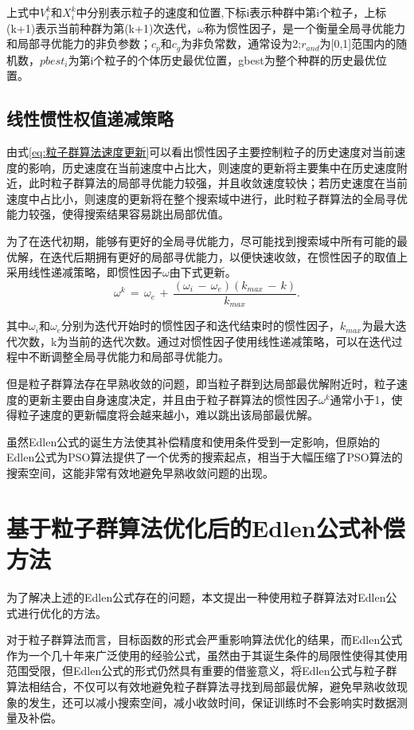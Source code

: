 上式中\(V^{k}_i\)和\( X^{k}_i\)中分别表示粒子的速度和位置,下标i表示种群中第i个粒子，上标(k+1)表示当前种群为第(k+1)次迭代，\(\omega\)称为惯性因子，是一个衡量全局寻优能力和局部寻优能力的非负参数；\(c_p\)和\(c_g\)为非负常数，通常设为2;\(r_{and}\)为[0,1]范围内的随机数，\(pbest_i\)为第i个粒子的个体历史最优位置，gbest为整个种群的历史最优位置。

\subsection{线性惯性权值递减策略}
由式\eqref{eq:粒子群算法速度更新}可以看出惯性因子主要控制粒子的历史速度对当前速度的影响，历史速度在当前速度中占比大，则速度的更新将主要集中在历史速度附近，此时粒子群算法的局部寻优能力较强，并且收敛速度较快；若历史速度在当前速度中占比小，则速度的更新将在整个搜索域中进行，此时粒子群算法的全局寻优能力较强，使得搜索结果容易跳出局部优值。

为了在迭代初期，能够有更好的全局寻优能力，尽可能找到搜索域中所有可能的最优解，在迭代后期拥有更好的局部寻优能力，以便快速收敛，在惯性因子的取值上采用线性递减策略\cite{冯浩2015一种改进的粒子群优化算法惯性权值递减策略}，即惯性因子\(\omega\)由下式更新。
\begin{equation}\label{eq:omega更新公式}
  \omega^k\,=\,\omega_e\,+\,\frac{(\omega_i\,-\,\omega_e)(k_{max}\,-\,k)}{k_{max}}.
  \end{equation}

其中\(\omega_i\)和\(\omega_e\)分别为迭代开始时的惯性因子和迭代结束时的惯性因子，\(k_{max}\)为最大迭代次数，k为当前的迭代次数。通过对惯性因子使用线性递减策略，可以在迭代过程中不断调整全局寻优能力和局部寻优能力。

但是粒子群算法存在早熟收敛的问题，即当粒子群到达局部最优解附近时，粒子速度的更新主要由自身速度决定，并且由于粒子群算法的惯性因子\(\omega^k\)通常小于1，使得粒子速度的更新幅度将会越来越小，难以跳出该局部最优解\cite{范培蕾2009克服早熟收敛现象的粒子群优化算法}。

虽然Edlen公式的诞生方法使其补偿精度和使用条件受到一定影响，但原始的Edlen公式为PSO算法提供了一个优秀的搜索起点，相当于大幅压缩了PSO算法的搜索空间，这能非常有效地避免早熟收敛问题的出现。

\section{基于粒子群算法优化后的Edlen公式补偿方法}
为了解决上述的Edlen公式存在的问题，本文提出一种使用粒子群算法对Edlen公式进行优化的方法。

对于粒子群算法而言，目标函数的形式会严重影响算法优化的结果，而Edlen公式作为一个几十年来广泛使用的经验公式，虽然由于其诞生条件的局限性使得其使用范围受限，但Edlen公式的形式仍然具有重要的借鉴意义，将Edlen公式与粒子群算法相结合，不仅可以有效地避免粒子群算法寻找到局部最优解，避免早熟收敛现象的发生，还可以减小搜索空间，减小收敛时间，保证训练时不会影响实时数据测量及补偿。
